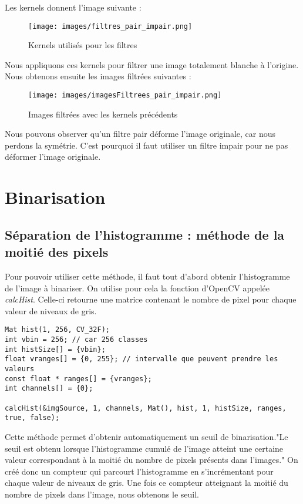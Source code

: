 \documentclass{article}
\begin{document}
Les kernels donnent l'image suivante :
\begin{figure}[h!]
   \centering
   \caption{Kernels utilisés pour les filtres}
   \texttt{[image: images/filtres\_pair\_impair.png]}
\end{figure}

Nous appliquons ces kernels pour filtrer une image totalement blanche à l'origine. Nous obtenons ensuite les images filtrées suivantes : 

\begin{figure}[h!]
   \centering
   \caption{Images filtrées avec les kernels précédents}
   \texttt{[image: images/imagesFiltrees\_pair\_impair.png]}
\end{figure}

Nous pouvons observer qu'un filtre pair déforme l'image originale, car nous perdons la symétrie. C'est pourquoi il faut utiliser un filtre impair pour ne pas déformer l'image originale.


 \section{Binarisation}

 \subsection{Séparation de l'histogramme : méthode de la moitié des pixels}
 Pour pouvoir utiliser cette méthode, il faut tout d'abord obtenir l'histogramme de l'image à binariser. On utilise pour cela la fonction d'OpenCV appelée \emph{calcHist}. Celle-ci retourne une matrice contenant le nombre de pixel pour chaque valeur de niveaux de gris.\\

 \begin{lstlisting}
Mat hist(1, 256, CV_32F);
int vbin = 256; // car 256 classes
int histSize[] = {vbin};
float vranges[] = {0, 255}; // intervalle que peuvent prendre les valeurs
const float * ranges[] = {vranges};
int channels[] = {0};

calcHist(&imgSource, 1, channels, Mat(), hist, 1, histSize, ranges, true, false);
\end{lstlisting}

 Cette méthode permet d'obtenir automatiquement un seuil de binarisation."Le seuil est obtenu lorsque l'histogramme cumulé de l'image atteint une certaine valeur correspondant à la moitié du nombre de pixels présents dans l'images." On créé donc un compteur qui parcourt l'histogramme en s'incrémentant pour chaque valeur de niveaux de gris. Une fois ce compteur atteignant la moitié du nombre de pixels dans l'image, nous obtenons le seuil.\\
\end{document}
